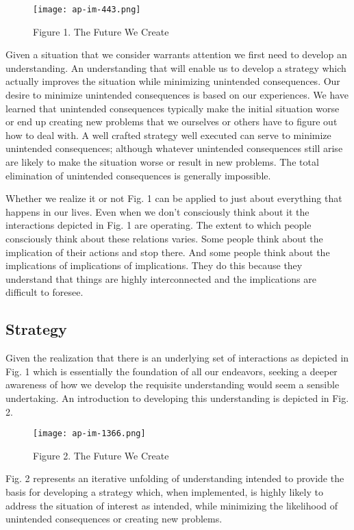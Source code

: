\documentclass[]{memoir}
\let\Oldincludegraphics\includegraphics
\renewcommand{\includegraphics}[1]{\Oldincludegraphics[max size={\textwidth}{\textheight}]{#1}}
\begin{document}
\begin{figure}[htbp]
\centering
\texttt{[image: ap-im-443.png]}
\caption{Figure 1. The Future We Create}
\end{figure}

Given a situation that we consider warrants attention we first need to
develop an understanding. An understanding that will enable us to
develop a strategy which actually improves the situation while
minimizing unintended consequences. Our desire to minimize unintended
consequences is based on our experiences. We have learned that
unintended consequences typically make the initial situation worse or
end up creating new problems that we ourselves or others have to figure
out how to deal with. A well crafted strategy well executed can serve to
minimize unintended consequences; although whatever unintended
consequences still arise are likely to make the situation worse or
result in new problems. The total elimination of unintended consequences
is generally impossible.

Whether we realize it or not Fig. 1 can be applied to just about
everything that happens in our lives. Even when we don't consciously
think about it the interactions depicted in Fig. 1 are operating. The
extent to which people consciously think about these relations varies.
Some people think about the implication of their actions and stop there.
And some people think about the implications of implications of
implications. They do this because they understand that things are
highly interconnected and the implications are difficult to foresee.

\subsection{Strategy}

Given the realization that there is an underlying set of interactions as
depicted in Fig. 1 which is essentially the foundation of all our
endeavors, seeking a deeper awareness of how we develop the requisite
understanding would seem a sensible undertaking. An introduction to
developing this understanding is depicted in Fig. 2.

\begin{figure}[htbp]
\centering
\texttt{[image: ap-im-1366.png]}
\caption{Figure 2. The Future We Create}
\end{figure}

Fig. 2 represents an iterative unfolding of understanding intended to
provide the basis for developing a strategy which, when implemented, is
highly likely to address the situation of interest as intended, while
minimizing the likelihood of unintended consequences or creating new
problems.
\end{document}
